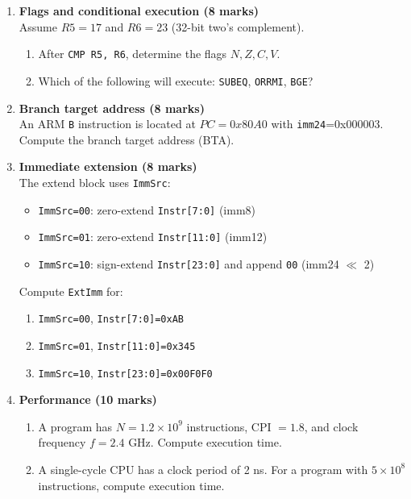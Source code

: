 \documentclass[11pt]{article}
\begin{document}
\begin{enumerate}[label=\textbf{B\arabic*.}]
  \item \textbf{Flags and conditional execution (8 marks)}\\
  Assume $R5=17$ and $R6=23$ (32-bit two's complement).
  \begin{enumerate}[label=(\alph*)]
    \item After \texttt{CMP R5, R6}, determine the flags $N,Z,C,V$.
    \item Which of the following will execute: \texttt{SUBEQ}, \texttt{ORRMI}, \texttt{BGE}?
  \end{enumerate}

  \item \textbf{Branch target address (8 marks)}\\
  An ARM \texttt{B} instruction is located at $PC=0x80A0$ with \texttt{imm24}=0x000003.
  Compute the branch target address (BTA).

  \item \textbf{Immediate extension (8 marks)}\\
  The extend block uses \texttt{ImmSrc}:
  \begin{itemize}[leftmargin=1.5em]
    \item \texttt{ImmSrc=00}: zero-extend \texttt{Instr[7:0]} (imm8)
    \item \texttt{ImmSrc=01}: zero-extend \texttt{Instr[11:0]} (imm12)
    \item \texttt{ImmSrc=10}: sign-extend \texttt{Instr[23:0]} and append \texttt{00} (imm24 $\ll$ 2)
  \end{itemize}
  Compute \texttt{ExtImm} for:
  \begin{enumerate}[label=(\alph*)]
    \item \texttt{ImmSrc=00}, \texttt{Instr[7:0]=0xAB}
    \item \texttt{ImmSrc=01}, \texttt{Instr[11:0]=0x345}
    \item \texttt{ImmSrc=10}, \texttt{Instr[23:0]=0x00F0F0}
  \end{enumerate}

  \item \textbf{Performance (10 marks)}\\
  \begin{enumerate}[label=(\alph*)]
    \item A program has $N=1.2\times 10^9$ instructions, CPI $=1.8$, and clock frequency $f=2.4$ GHz. Compute execution time.
    \item A single-cycle CPU has a clock period of 2 ns. For a program with $5\times 10^8$ instructions, compute execution time.
  \end{enumerate}
\end{enumerate}
\end{document}
